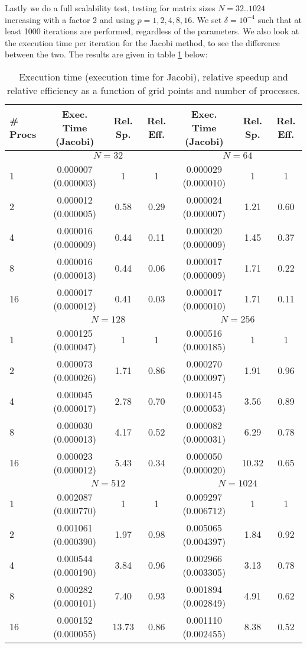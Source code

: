 \documentclass[11pt,a4paper,onecolumn]{article}
\begin{document}
Lastly we do a full scalability test, testing for matrix sizes $N = 32..1024$ increasing with a factor 2 and using $p = 1,2,4,8,16$. We set $\delta = 10^{-4}$ such that at least 1000 iterations are performed, regardless of the parameters. We also look at the execution time per iteration for the Jacobi method, to see the difference between the two. The results are given in table \ref{tab:gauss} below:

\begin{table}[H]
  \centering
  \begin{tabular}{l | c | c | c | c | c | c}
    \# Procs & Exec. Time (Jacobi) & Rel. Sp. & Rel. Eff. & Exec. Time (Jacobi) & Rel. Sp. & Rel. Eff.\\
    \hline
    \multicolumn{1}{c}{} & \multicolumn{3}{c}{$N = 32$} & \multicolumn{3}{c}{$N = 64$} \\
    \hline
    1 & 0.000007 (0.000003) & 1 & 1 & 0.000029 (0.000010) & 1 & 1\\ 
    2 & 0.000012 (0.000005) & 0.58 & 0.29 & 0.000024 (0.000007) & 1.21 & 0.60\\
    4 & 0.000016 (0.000009) & 0.44 & 0.11 & 0.000020 (0.000009) & 1.45 & 0.37\\
    8 & 0.000016 (0.000013) & 0.44 & 0.06 & 0.000017 (0.000009) & 1.71 & 0.22\\
    16 & 0.000017 (0.000012) & 0.41 & 0.03 & 0.000017 (0.000010) & 1.71 & 0.11\\
    \hline
    \multicolumn{1}{c}{} & \multicolumn{3}{c}{$N = 128$} & \multicolumn{3}{c}{$N = 256$} \\
    \hline
    1 & 0.000125 (0.000047) & 1 & 1 & 0.000516 (0.000185) & 1 & 1\\
    2 & 0.000073 (0.000026) & 1.71 & 0.86 & 0.000270 (0.000097) & 1.91 & 0.96\\
    4 & 0.000045 (0.000017) & 2.78 & 0.70 & 0.000145 (0.000053) & 3.56 & 0.89\\
    8 & 0.000030 (0.000013) & 4.17 & 0.52 & 0.000082 (0.000031) & 6.29 & 0.78\\
    16 & 0.000023 (0.000012) & 5.43 & 0.34 & 0.000050 (0.000020) & 10.32 & 0.65\\
    \hline
    \multicolumn{1}{c}{} & \multicolumn{3}{c}{$N = 512$} & \multicolumn{3}{c}{$N = 1024$} \\
    \hline
    1 & 0.002087 (0.000770) & 1 & 1 & 0.009297 (0.006712) & 1 & 1\\ 
    2 & 0.001061 (0.000390) & 1.97 & 0.98 & 0.005065 (0.004397) & 1.84 & 0.92\\ 
    4 & 0.000544 (0.000190) & 3.84 & 0.96 & 0.002966 (0.003305) & 3.13 & 0.78\\
    8 & 0.000282 (0.000101) & 7.40 & 0.93 & 0.001894 (0.002849) & 4.91 & 0.62\\
    16 & 0.000152 (0.000055) & 13.73 & 0.86 & 0.001110 (0.002455) & 8.38 & 0.52 \\
  \end{tabular}
  \caption{Execution time (execution time for Jacobi), relative speedup and relative efficiency as a function of grid points and number of processes.}
  \label{tab:gauss}
\end{table}
\end{document}
